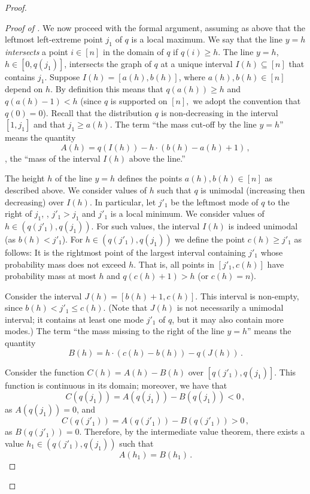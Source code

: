 \begin{proof}
\begin{proof}[Proof of ]
We now proceed with the formal argument, assuming as above that
the leftmost left-extreme point $j_{{1}}$ of $q$ is a local maximum.
We say that the line $y=h$ \emph{intersects} a point $i \in [n]$ in the domain of $q$ if
$q(i) \geq h$.  The line $y = h$, $h \in [0,q(j_{{1}})]$, intersects the graph of $q$ at a unique interval $I(h) \subseteq [n]$ that contains $j_{{1}}$.
%
Suppose $I(h) = [a(h),b(h)]$, where $a(h),b(h) \in [n]$ depend on $h$.
By definition this means that $q(a(h)) \geq h$ and $q(a(h)-1) < h$
{(since $q$ is supported on $[n],$ 
we adopt the convention that $q(0)=0$).}
Recall that the distribution $q$ is non-decreasing
in the interval $[1,j_{{1}}]$ and that $j_{{1}} \geq a(h)$.
The term ``the mass cut-off by the line $y=h$'' means
the quantity $$A(h) = q\left( I(h) \right) - h \cdot (b(h)-a(h)+1)\,,$$
\ie, the ``mass of the interval $I(h)$ above the line.''

The height $h$ of the line $y=h$ defines the points $a(h), b(h)\in [n]$ as described above.
We consider values of $h$ such that $q$ is unimodal (increasing then decreasing) over $I(h)$.
In particular, let $j'_{{1}}$ be the leftmost mode of $q$ to the right of $j_{{1}}$,
\ie, $j'_{{1}}>j_{{1}}$ and $j'_{{1}}$ is a local minimum.
We consider values of $h \in (q(j'_{{1}}), q(j_{{1}}))$. For such values, the
interval $I(h)$ is indeed unimodal (as $b(h) < j'_{{1}}$).
For  $h \in (q(j'_{{1}}), q(j_{{1}}))$ we define the point $c(h) \geq j'_{{1}}$ as follows:
It is the rightmost point of the largest interval containing
$j'_{{1}}$ whose probability mass does not exceed $h$. That is, all points
in $[j'_{{1}}, c(h)]$ have probability mass at most $h$ and $q(c(h)+1) > h$
(or $c(h)=n$).

Consider the interval $J(h) = [b(h)+1, c(h)]$.
This interval is non-empty, since $b(h)< j'_{{1}} \leq c(h)$.
(Note that $J(h)$ is not necessarily a unimodal interval; it contains at
least one mode $j'_{{1}}$ {of $q$}, but it may also contain more modes.)
The term ``the mass missing to the right of the line $y=h$''
means the quantity $$B(h) = h \cdot (c(h)-b(h)) - q\left(J(h)\right)\,.$$

Consider the function $C(h) = A(h) - B(h)$ over $[q(j'_{{1}}), q(j_{{1}})]$.
This function is continuous in its domain; moreover, we have that
$$C\left(q(j_{{1}})\right) = A\left(q(j_{{1}})\right) - B\left(q(j_{{1}})\right) <0\,,$$
as $A\left(q(j_{{1}})\right)=0$,
and $$C\left(q(j'_{{1}})\right) = A\left(q(j'_{{1}})\right) - B\left(q(j'_{{1}})\right) > 0\,,$$
as $B\left(q(j'_{{1}})\right)=0$. Therefore, by the intermediate value theorem,
there exists a value $h_{{1}} \in (q(j'_{{1}}), q(j_{{1}}))$ such that $$A(h_{{1}}) = B(h_{{1}})\,.$$


\end{proof}
\end{proof}
